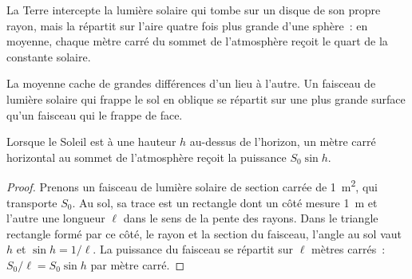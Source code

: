 \begin{omfigure}

{\small La Terre intercepte la lumière solaire qui tombe sur un disque de
son propre rayon, mais la répartit sur l'aire quatre fois plus grande d'une
sphère~: en moyenne, chaque mètre carré du sommet de l'atmosphère reçoit le
quart de la constante solaire.}
\end{omfigure}

La moyenne cache de grandes différences d'un lieu à l'autre. Un faisceau de
lumière solaire qui frappe le sol en oblique se répartit sur une plus grande
surface qu'un faisceau qui le frappe de face.

\begin{proposition}\label{prop:g10:earth-energy-budget:height}
Lorsque le Soleil est à une hauteur $h$ au-dessus de l'horizon, un mètre
carré horizontal au sommet de l'atmosphère reçoit la puissance $S_0 \sin h$.
\end{proposition}

\begin{proof}
Prenons un faisceau de lumière solaire de section carrée de \qty{1}{m^2},
qui transporte $S_0$. Au sol, sa trace est un rectangle dont un côté mesure
\qty{1}{m} et l'autre une longueur $\ell$ dans le sens de la pente des
rayons. Dans le triangle rectangle formé par ce côté, le rayon et la section
du faisceau, l'angle au sol vaut $h$ et $\sin h = 1/\ell$. La puissance du
faisceau se répartit sur $\ell$ mètres carrés~: $S_0/\ell = S_0 \sin h$ par
mètre carré.
\end{proof}

